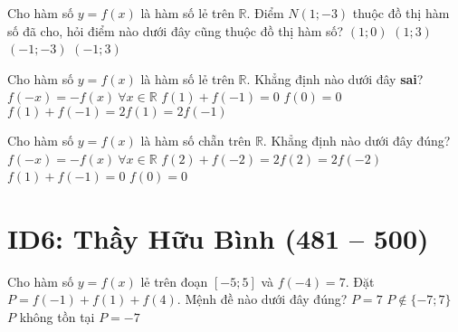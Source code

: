 \begin{ex}%
	Cho hàm số $y=f(x)$ là hàm số lẻ trên $\mathbb{R}$. Điểm $N(1;-3)$ thuộc đồ thị hàm số đã cho, hỏi điểm nào dưới đây cũng thuộc đồ thị hàm số?
	\choice
	{$(1;0)$} 
	{$(1;3)$}
	{$(-1;-3)$}
	{\True $(-1;3)$}
\end{ex}

\begin{ex}%
	Cho hàm số $y=f(x)$ là hàm số lẻ trên $\mathbb{R}.$ Khẳng định nào dưới đây {\bf sai}?
	\choice
	{$f(-x)=-f(x) \ \forall x\in \mathbb{R}$}
	{$f(1)+f(-1)=0$}
	{$f(0)=0$}
	{\True $f(1)+f(-1)=2f(1)=2f(-1)$}
\end{ex}

\begin{ex}%
	Cho hàm số $y=f(x)$ là hàm số chẵn trên $\mathbb{R}.$ Khẳng định nào dưới đây đúng?
	\choice
	{$f(-x)=-f(x) \ \forall x\in \mathbb{R}$}
	{\True $f(2)+f(-2)=2f(2)=2f(-2)$}
	{$f(1)+f(-1)=0$}
	{$f(0)=0$}
\end{ex}



\section*{ID6: Thầy Hữu Bình (481 -- 500)}
\begin{ex}%
	Cho hàm số $y=f(x)$ lẻ trên đoạn $[-5;5]$ và $f(-4)=7$. Đặt $P=f(-1)+f(1)+f(4)$. Mệnh đề nào dưới đây đúng?
	\choice
	{$P=7$}
	{$P\notin \{-7;7\}$}
	{$P$ không tồn tại}
	{\True $P=-7$}
\end{ex}

